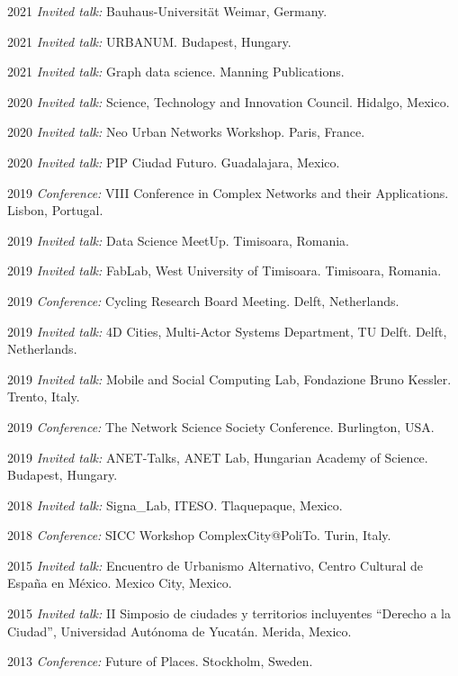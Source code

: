 \documentclass{academiccv}
\begin{document}
\begin{tablist}
	\item[2021] \tab \textit{Invited talk:} Bauhaus-Universität Weimar, Germany. 
	\item[2021] \tab \textit{Invited talk:} URBANUM. Budapest, Hungary.
	\item[2021] \tab \textit{Invited talk:} Graph data science. Manning Publications.
	\item[2020] \tab \textit{Invited talk:} Science, Technology and Innovation Council. Hidalgo, Mexico.
	\item[2020] \tab \textit{Invited talk:} Neo Urban Networks Workshop. Paris, France.
	\item[2020] \tab \textit{Invited talk:} PIP Ciudad Futuro. Guadalajara, Mexico.
	\item[2019] \tab \textit{Conference:} VIII Conference in Complex Networks and their Applications. Lisbon, Portugal.
	\item[2019] \tab \textit{Invited talk:} Data Science MeetUp. Timisoara, Romania.
	\item[2019] \tab \textit{Invited talk:} FabLab, West University of Timisoara. Timisoara, Romania.
	\item[2019] \tab \textit{Conference:} Cycling Research Board Meeting. Delft, Netherlands.
	\item[2019] \tab \textit{Invited talk:} 4D Cities, Multi-Actor Systems Department, TU Delft. Delft, Netherlands.
	\item[2019] \tab \textit{Invited talk:} Mobile and Social Computing Lab, Fondazione Bruno Kessler. Trento, Italy.
	\item[2019] \tab \textit{Conference:} The Network Science Society Conference. Burlington, USA.
	\item[2019] \tab \textit{Invited talk:} ANET-Talks, ANET Lab, Hungarian Academy of Science. Budapest, Hungary.
	\item[2018] \tab \textit{Invited talk:} Signa\_Lab, ITESO. Tlaquepaque, Mexico.
	\item[2018] \tab \textit{Conference:} SICC Workshop ComplexCity@PoliTo. Turin, Italy. 
	\item[2015] \tab \textit{Invited talk:} Encuentro de Urbanismo Alternativo, Centro Cultural de España en México. Mexico City, Mexico.
	\item[2015] \tab \textit{Invited talk:} II Simposio de ciudades y territorios incluyentes \enquote{Derecho a la Ciudad}, Universidad Autónoma de Yucatán. Merida, Mexico.
	\item[2013] \tab \textit{Conference:} Future of Places. Stockholm, Sweden.
\end{tablist}
\end{document}
